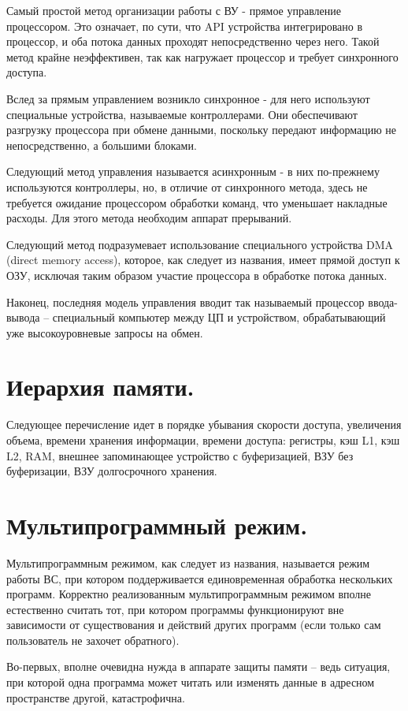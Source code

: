 \documentclass[a4paper,12pt,titlepage,finall]{article}
\begin{document}
Самый простой метод организации работы с ВУ - прямое управление процессором. Это означает, по сути, что API устройства интегрировано в процессор, и оба потока данных проходят непосредственно через него. Такой метод крайне неэффективен, так как нагружает процессор и требует синхронного доступа.

Вслед за прямым управлением возникло синхронное - для него используют специальные устройства, называемые контроллерами. Они обеспечивают разгрузку процессора при обмене данными, поскольку передают информацию не непосредственно, а большими блоками.

Следующий метод управления называется асинхронным - в них по-прежнему используются контроллеры, но, в отличие от синхронного метода, здесь не требуется ожидание процессором обработки команд, что уменьшает накладные расходы. Для этого метода необходим аппарат прерываний.


Следующий метод подразумевает использование специального устройства DMA (direct memory access), которое, как следует из названия, имеет прямой доступ к ОЗУ, исключая таким образом участие процессора в обработке потока данных.

Наконец, последняя модель управления вводит так называемый процессор ввода-вывода -- специальный компьютер между ЦП и устройством, обрабатывающий уже высокоуровневые запросы на обмен.

\section{Иерархия памяти.}
Следующее перечисление идет в порядке убывания скорости доступа, увеличения объема, времени хранения информации, времени доступа: регистры, кэш L1, кэш L2, RAM, внешнее запоминающее устройство с буферизацией, ВЗУ без буферизации, ВЗУ долгосрочного хранения.
\section{Мультипрограммный режим.}
Мультипрограммным режимом, как следует из названия, называется режим работы ВС, при котором поддерживается единовременная обработка нескольких программ. Корректно реализованным мультипрограммным режимом вполне естественно считать тот, при котором программы функционируют вне зависимости от существования и действий других программ (если только сам пользователь не захочет обратного).

Во-первых, вполне очевидна нужда в аппарате защиты памяти -- ведь ситуация, при которой одна программа может читать или изменять данные в адресном пространстве другой, катастрофична.
\end{document}
